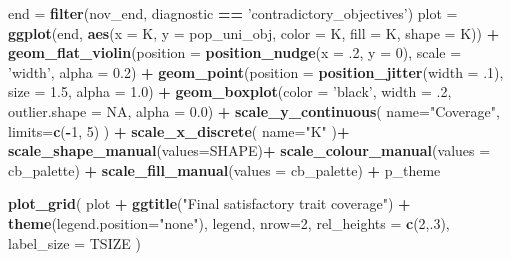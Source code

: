 \documentclass[]{book}
\newenvironment{Shaded}{\begin{snugshade}}{\end{snugshade}}
\newcommand{\DataTypeTok}[1]{\textcolor[rgb]{0.13,0.29,0.53}{#1}}
\newcommand{\DecValTok}[1]{\textcolor[rgb]{0.00,0.00,0.81}{#1}}
\newcommand{\FloatTok}[1]{\textcolor[rgb]{0.00,0.00,0.81}{#1}}
\newcommand{\KeywordTok}[1]{\textcolor[rgb]{0.13,0.29,0.53}{\textbf{#1}}}
\newcommand{\NormalTok}[1]{#1}
\newcommand{\OperatorTok}[1]{\textcolor[rgb]{0.81,0.36,0.00}{\textbf{#1}}}
\newcommand{\OtherTok}[1]{\textcolor[rgb]{0.56,0.35,0.01}{#1}}
\newcommand{\StringTok}[1]{\textcolor[rgb]{0.31,0.60,0.02}{#1}}
\begin{document}
\begin{Shaded}
\begin{Highlighting}[]
\NormalTok{end =}\StringTok{ }\KeywordTok{filter}\NormalTok{(nov_end, diagnostic }\OperatorTok{==}\StringTok{ 'contradictory_objectives'}\NormalTok{)}
\NormalTok{plot =}\StringTok{ }\KeywordTok{ggplot}\NormalTok{(end, }\KeywordTok{aes}\NormalTok{(}\DataTypeTok{x =}\NormalTok{ K, }\DataTypeTok{y =}\NormalTok{ pop_uni_obj, }\DataTypeTok{color =}\NormalTok{ K, }\DataTypeTok{fill =}\NormalTok{ K, }\DataTypeTok{shape =}\NormalTok{ K)) }\OperatorTok{+}
\StringTok{  }\KeywordTok{geom_flat_violin}\NormalTok{(}\DataTypeTok{position =} \KeywordTok{position_nudge}\NormalTok{(}\DataTypeTok{x =} \FloatTok{.2}\NormalTok{, }\DataTypeTok{y =} \DecValTok{0}\NormalTok{), }\DataTypeTok{scale =} \StringTok{'width'}\NormalTok{, }\DataTypeTok{alpha =} \FloatTok{0.2}\NormalTok{) }\OperatorTok{+}
\StringTok{  }\KeywordTok{geom_point}\NormalTok{(}\DataTypeTok{position =} \KeywordTok{position_jitter}\NormalTok{(}\DataTypeTok{width =} \FloatTok{.1}\NormalTok{), }\DataTypeTok{size =} \FloatTok{1.5}\NormalTok{, }\DataTypeTok{alpha =} \FloatTok{1.0}\NormalTok{) }\OperatorTok{+}
\StringTok{  }\KeywordTok{geom_boxplot}\NormalTok{(}\DataTypeTok{color =} \StringTok{'black'}\NormalTok{, }\DataTypeTok{width =} \FloatTok{.2}\NormalTok{, }\DataTypeTok{outlier.shape =} \OtherTok{NA}\NormalTok{, }\DataTypeTok{alpha =} \FloatTok{0.0}\NormalTok{) }\OperatorTok{+}
\StringTok{  }\KeywordTok{scale_y_continuous}\NormalTok{(}
    \DataTypeTok{name=}\StringTok{"Coverage"}\NormalTok{,}
    \DataTypeTok{limits=}\KeywordTok{c}\NormalTok{(}\OperatorTok{-}\DecValTok{1}\NormalTok{, }\DecValTok{5}\NormalTok{)}
\NormalTok{  ) }\OperatorTok{+}
\StringTok{  }\KeywordTok{scale_x_discrete}\NormalTok{(}
    \DataTypeTok{name=}\StringTok{"K"}
\NormalTok{  )}\OperatorTok{+}
\StringTok{  }\KeywordTok{scale_shape_manual}\NormalTok{(}\DataTypeTok{values=}\NormalTok{SHAPE)}\OperatorTok{+}
\StringTok{  }\KeywordTok{scale_colour_manual}\NormalTok{(}\DataTypeTok{values =}\NormalTok{ cb_palette) }\OperatorTok{+}
\StringTok{  }\KeywordTok{scale_fill_manual}\NormalTok{(}\DataTypeTok{values =}\NormalTok{ cb_palette) }\OperatorTok{+}
\StringTok{  }\NormalTok{p_theme}

\KeywordTok{plot_grid}\NormalTok{(}
\NormalTok{  plot }\OperatorTok{+}
\StringTok{    }\KeywordTok{ggtitle}\NormalTok{(}\StringTok{"Final satisfactory trait coverage"}\NormalTok{) }\OperatorTok{+}
\StringTok{    }\KeywordTok{theme}\NormalTok{(}\DataTypeTok{legend.position=}\StringTok{"none"}\NormalTok{),}
\NormalTok{  legend,}
  \DataTypeTok{nrow=}\DecValTok{2}\NormalTok{,}
  \DataTypeTok{rel_heights =} \KeywordTok{c}\NormalTok{(}\DecValTok{2}\NormalTok{,.}\DecValTok{3}\NormalTok{),}
  \DataTypeTok{label_size =}\NormalTok{ TSIZE}
\NormalTok{)}
\end{Highlighting}
\end{Shaded}
\end{document}
